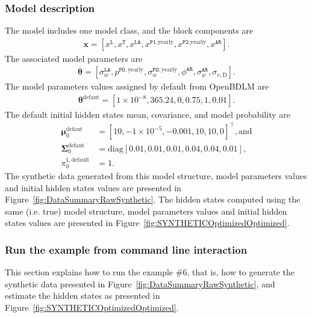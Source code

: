 \subsubsection{Model description}
The model includes one model class, and the block components are 
\begin{gather*}
\textbf{x}=[x^{\mathtt{L}}, x^{\mathtt{T}}, x^{\mathtt{LA}}, x^{\mathtt{P1}\text{,yearly}}, x^{\mathtt{P2}\text{,yearly}}, x^{\mathtt{AR}}].
\end{gather*}
The associated model parameters are
\begin{gather*}
\bm\theta=[\sigma_{w}^{\mathtt{LA}}, p^{\mathtt{PD}, \text{yearly}}, \sigma_{w}^{\mathtt{PD}, \text{yearly}}, \phi^{\mathtt{AR}}, \sigma_{w}^{\mathtt{AR}}, \sigma_{v,\text{D}}].
 \end{gather*}
The model parameters values assigned by default from OpenBDLM are
\begin{gather*}
\bm\theta^{\text{defaut}}=[ 1\times10^{-8}, 365.24, 0, 0.75, 1, 0.01].
\end{gather*}
The default initial hidden states mean, covariance, and model probability are 
\begin{align*}
\bm \mu^{\text{defaut}}_{0} & = [	 10  , -1\times10^{-5}  ,	-0.001	,	10  ,  	10    ,	0  ]^{\intercal}, \text{and} \\
\bm\Sigma^{\text{defaut}}_{0} & = \text{diag}[ 0.01  ,	0.01  ,	0.01  	,0.04  ,	0.04  ,	0.01 ], \\
 \pi_{0}^{1,\text{default}} & = 1.
 \end{align*}
The synthetic data generated from this model structure, model parameters values and initial hidden states values are presented in Figure~\ref{fig:DataSummaryRawSynthetic}.
The hidden states computed using the same (i.e. true) model structure, model parameters values and initial hidden states values are presented in Figure~\ref{fig:SYNTHETICOptimizedOptimized}.

\subsubsection{Run the example from command line interaction}

This section explains how to run the example \#6, that is, how to generate the synthetic data presented in Figure~\ref{fig:DataSummaryRawSynthetic}, and estimate the hidden states as presented in Figure~\ref{fig:SYNTHETICOptimizedOptimized}.


